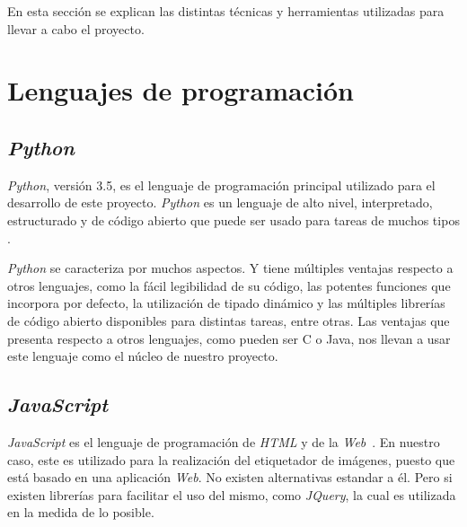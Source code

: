 

En esta sección se explican las distintas técnicas y herramientas utilizadas para llevar a cabo el proyecto.

\section{Lenguajes de programación}\label{tecyher}

\subsection{\textit{Python}}
\textit{Python}, versión 3.5, es el lenguaje de programación principal utilizado para el desarrollo de este proyecto. \textit{Python} es un lenguaje de alto nivel, interpretado, estructurado y de código abierto que puede ser usado para tareas de muchos tipos \cite{wiki:python}.

\textit{Python} se caracteriza por muchos aspectos. Y tiene múltiples ventajas respecto a otros lenguajes, como la fácil legibilidad de su código, las potentes funciones que incorpora por defecto, la utilización de tipado dinámico y las múltiples librerías de código abierto disponibles para distintas tareas, entre otras. Las ventajas que presenta respecto a otros lenguajes, como pueden ser C o Java, nos llevan a usar este lenguaje como el núcleo de nuestro proyecto.

\subsection{\textit{JavaScript}}
\textit{JavaScript} es el lenguaje de programación de \textit{HTML} y de la \textit{Web}~\cite{w3schools:javascript}. En nuestro caso, este es utilizado para la realización del etiquetador de imágenes, puesto que está basado en una aplicación \textit{Web}. No existen alternativas estandar a él. Pero si existen librerías para facilitar el uso del mismo, como \textit{JQuery}, la cual es utilizada en la medida de lo posible.

